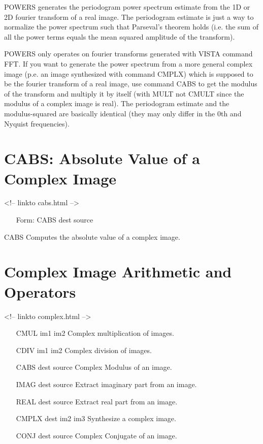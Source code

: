 POWERS generates the periodogram power spectrum estimate from the 1D or 2D
fourier transform of a real image. The periodogram estimate is just a way
to normalize the power spectrum such that Parseval's theorem holds
(i.e. the sum of all the power terms equals the mean squared amplitude of
the transform).

POWERS only operates on fourier transforms generated with VISTA command
FFT. If you want to generate the power spectrum from a more general
complex image (p.e. an image synthesized with command CMPLX) which is
supposed to be the fourier transform of a real image, use command CABS to
get the modulus of the transform and multiply it by itself (with MULT not
CMULT since the modulus of a complex image is real). The periodogram
estimate and the modulus-squared are basically identical (they may only
differ in the 0th and Nyquist frequencies).

\section{CABS: Absolute Value of a Complex Image}
\begin{rawhtml}
<!-- linkto cabs.html -->
\end{rawhtml}
\begin{itemize}
  \item[Form: CABS dest source\hfill]{}
\end{itemize}

CABS Computes the absolute value of a complex image.

\section{Complex Image Arithmetic and Operators}
\begin{rawhtml}
<!-- linkto complex.html -->
\end{rawhtml}
\begin{itemize}
  \item[CMUL im1 im2\hfill]{Complex multiplication of images.}
  \item[CDIV im1 im2\hfill]{Complex division of images.}
  \item[CABS dest source   \hfill]{Complex Modulus of an image.}
  \item[IMAG dest source   \hfill]{Extract imaginary part from an image.}
  \item[REAL dest source   \hfill]{Extract real part from an image.}
  \item[CMPLX dest im2 im3 \hfill]{Synthesize a complex image}.
  \item[CONJ dest source   \hfill]{Complex Conjugate of an image.}
\end{itemize}

